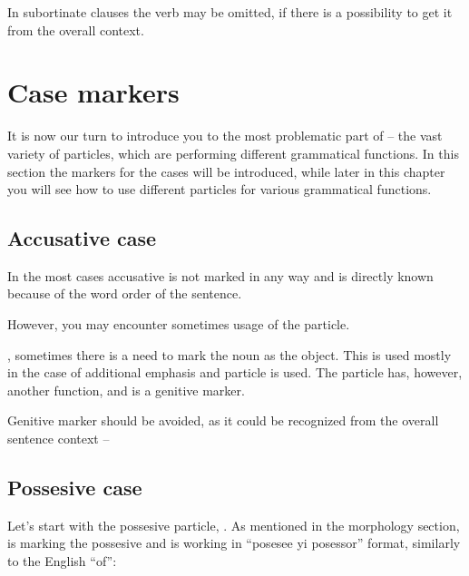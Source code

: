 
In subortinate clauses the verb may be omitted, if there is a possibility to get
it from the overall context.

\section{Case markers}
\label{sec:cases}

It is now our turn to introduce you to the most problematic part of \andro --
the vast variety of particles, which are performing different grammatical
functions. In this section the markers for the cases will be introduced, while
later in this chapter you will see how to use different particles for various
grammatical functions.

\subsection{Accusative case}

In the most cases accusative is not marked in any way and is directly known
because of the word order of the sentence.


However, you may encounter sometimes usage of the  particle.

, sometimes
there is a need to mark the noun as the object. This is used mostly in the case
of additional emphasis and  particle is used. The 
particle has, however, another function, and is a genitive \Gen{} marker.

Genitive marker should be avoided, as it could be recognized from the overall
sentence context --



\subsection{Possesive case}

Let's start with the possesive particle, . As mentioned in the
morphology section,  is marking the possesive and is working in
``posesee yi posessor'' format, similarly to the English ``of'':

